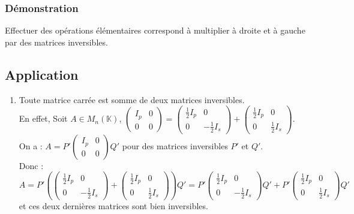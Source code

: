 \documentclass[a4paper,10pt]{book} %
\begin{document}
\subsubsection{Démonstration}
Effectuer des opérations élémentaires correspond à multiplier à droite et à gauche par des matrices inversibles.

\subsection{Application}
\begin{enumerate}
\item Toute matrice carrée est somme de deux matrices inversibles.\\

En effet, Soit $A\in M_n(\mathbb{K})$,
$\begin{pmatrix}
I_p&0\\
0&0
\end{pmatrix}=\begin{pmatrix}
\frac{1}{2}I_p&0\\
0&-\frac{1}{2}I_s
\end{pmatrix}+\begin{pmatrix}
\frac{1}{2}I_p&0\\
0&\frac{1}{2}I_s
\end{pmatrix}$.\\

On a :
$A=P'\begin{pmatrix}
I_p&0\\
0&0
\end{pmatrix}Q'$
pour des matrices inversibles $P'$ et $Q'$.\\

Donc :
$A=P'\left(\begin{pmatrix}
\frac{1}{2}I_p&0\\
0&-\frac{1}{2}I_s
\end{pmatrix}+\begin{pmatrix}
\frac{1}{2}I_p&0\\
0&\frac{1}{2}I_s
\end{pmatrix}\right)Q'=P'\begin{pmatrix}
\frac{1}{2}I_p&0\\
0&-\frac{1}{2}I_s
\end{pmatrix}Q'+P'\begin{pmatrix}
\frac{1}{2}I_p&0\\
0&\frac{1}{2}I_s
\end{pmatrix}Q'$
et ces deux dernières matrices sont bien inversibles.\\


\end{enumerate}
\end{document}
